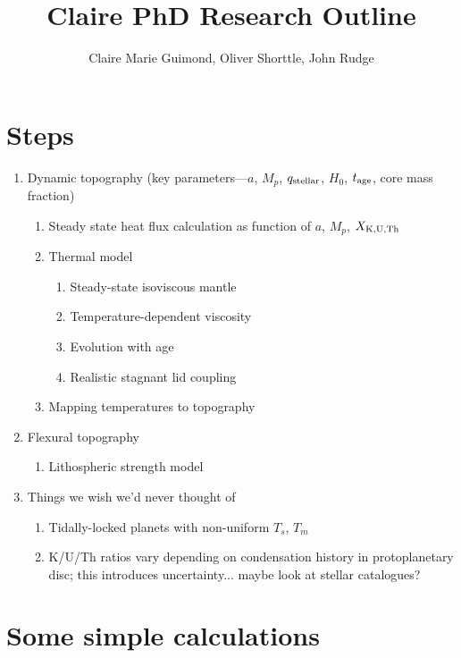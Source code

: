 \documentclass[10pt,a4paper]{article}
\author{Claire Marie Guimond, Oliver Shorttle, John Rudge}
\title{Claire PhD Research Outline}
\begin{document}
\maketitle

\section{Steps}
\begin{enumerate}
\item Dynamic topography (key parameters---$a$, $M_p$, $q_{\rm stellar}$, $H_0$, $t_{\rm age}$, core mass fraction)
\begin{enumerate}
\item Steady state heat flux calculation as function of $a$, $M_p$, $X_{\rm K, U, Th}$
\item Thermal model

\begin{enumerate}

\item Steady-state isoviscous mantle
\item Temperature-dependent viscosity
\item Evolution with age
\item Realistic stagnant lid coupling
\end{enumerate}
\item Mapping temperatures to topography
\end{enumerate}

\item Flexural topography
\begin{enumerate}
\item Lithospheric strength model
\end{enumerate}

\item Things we wish we'd never thought of
\begin{enumerate}
\item Tidally-locked planets with non-uniform $T_s$, $T_m$
\item K/U/Th ratios vary depending on condensation history in protoplanetary disc; this introduces uncertainty... maybe look at stellar catalogues?
\end{enumerate}

\end{enumerate}

\section{Some simple calculations}
\end{document}
